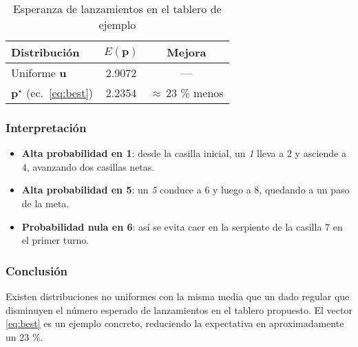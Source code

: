 \begin{table}[h]
  \centering
  \caption{Esperanza de lanzamientos en el tablero de ejemplo}
  \label{tab:results}
  \begin{tabular}{lcc}
    \toprule
    Distribución & $E(\mathbf{p})$ & Mejora \\\midrule
    Uniforme $\mathbf{u}$ & 2.9072 & --- \\
    $\mathbf{p}^\star$ (ec.~\ref{eq:best}) & 2.2354 & $\approx$\,23 \% menos \\
    \bottomrule
  \end{tabular}
\end{table}

\subsubsection{Interpretación}
\begin{itemize}
  \item \textbf{Alta probabilidad en 1}: desde la casilla inicial, un \emph{1} lleva a \(2\)
        y asciende a \(4\), avanzando dos casillas netas.
  \item \textbf{Alta probabilidad en 5}: un \emph{5} conduce a \(6\) y luego a \(8\),
        quedando a un paso de la meta.
  \item \textbf{Probabilidad nula en 6}: así se evita caer en la serpiente de la casilla \(7\)
        en el primer turno.
\end{itemize}

\subsubsection{Conclusión}
Existen distribuciones no uniformes con la misma media que un dado regular
que disminuyen el número esperado de lanzamientos en el tablero propuesto.
El vector \eqref{eq:best} es un ejemplo concreto, reduciendo la expectativa
en aproximadamente un 23 \%.
